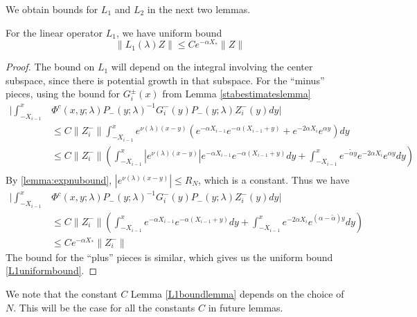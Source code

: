 \documentclass[thesis.tex]{subfiles}
\begin{document}
We obtain bounds for $L_1$ and $L_2$ in the next two lemmas.

\begin{lemma}\label{L1boundlemma}
For the linear operator $L_1$, we have uniform bound
\begin{equation}\label{L1uniformbound}
\|L_1(\lambda)Z\| \leq C e^{-\alpha X_*}\|Z\|
\end{equation}
\begin{proof}
The bound on $L_1$ will depend on the integral involving the center subspace, since there is potential growth in that subspace. For the ``minus'' pieces, using the bound for $G_i^\pm(x)$ from Lemma \ref{stabestimateslemma}
\begin{align*}
\Bigg| \int_{-X_{i-1}}^x &\Phi^c(x, y; \lambda) P_-(y; \lambda)^{-1} G_i^-(y) P_-(y; \lambda) Z_i^-(y) dy \Bigg| \\ 
&\leq C \| Z_i^-\|\int_{-X_{i-1}}^x e^{\nu(\lambda)(x - y)} \left( e^{-\alpha X_{i-1}} e^{-\alpha(X_{i-1} + y) } + e^{-2 \alpha X_i} e^{\alpha y} \right) dy \\
&\leq C \| Z_i^-\|\left( \int_{-X_{i-1}}^x \left|e^{\nu(\lambda)(x - y)}\right| e^{-\alpha X_{i-1}} e^{-\alpha(X_{i-1} + y) } dy + \int_{-X_{i-1}}^x e^{-\tilde{\alpha} y} e^{-2\alpha X_i} e^{\alpha y} dy \right) \\
\end{align*}
By \cref{lemma:expnubound}, $\left|e^{\nu(\lambda)(x - y)}\right| \leq R_N$, which is a constant. Thus we have
\begin{align*}
\Bigg| \int_{-X_{i-1}}^x &\Phi^c(x, y; \lambda) P_-(y; \lambda)^{-1} G_i^-(y) P_-(y; \lambda) Z_i^-(y) dy \Bigg| \\ 
&\leq C \| Z_i^-\|\left( \int_{-X_{i-1}}^x e^{-\alpha X_{i-1}} e^{-\alpha(X_{i-1} + y) } dy + \int_{-X_{i-1}}^x e^{-2\alpha X_i} e^{(\alpha - \tilde{\alpha}) y} dy \right) \\
&\leq C e^{-\alpha X_*} \| Z_i^-\| 
\end{align*}
The bound for the ``plus'' pieces is similar, which gives us the uniform bound \cref{L1uniformbound}.
\end{proof}
\end{lemma}

We note that the constant $C$ Lemma \ref{L1boundlemma} depends on the choice of $N$. This will be the case for all the constants $C$ in future lemmas.
\end{document}
